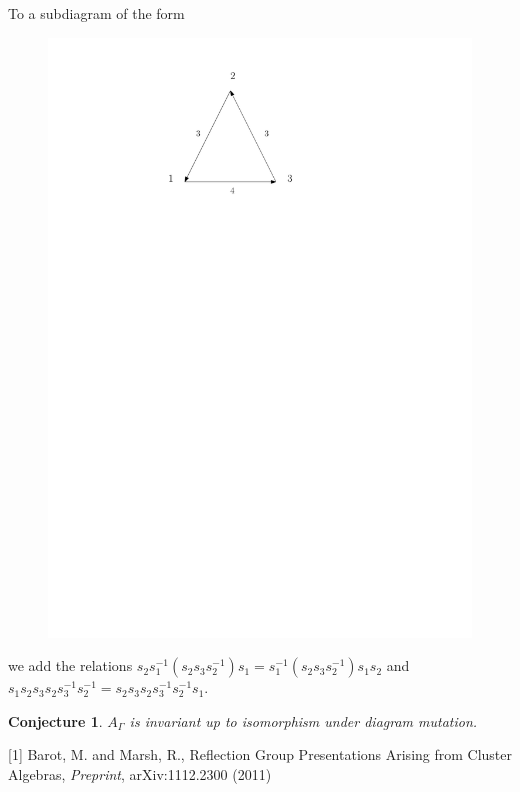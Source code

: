 \documentclass{beamer}
\newtheorem{Conjecture}{Conjecture}
\begin{document}
\begin{frame}
To a subdiagram of the form
\begin{figure}
\includegraphics[scale = .50]{Diagram5.pdf}
\end{figure}
we add the relations $s_{2}s_{1}^{-1}(s_{2}s_{3}s_{2}^{-1})s_{1} = s_{1}^{-1}(s_{2}s_{3}s_{2}^{-1})s_{1}s_{2}$ and $s_{1}s_{2}s_{3}s_{2}s_{3}^{-1}s_{2}^{-1} = s_{2}s_{3}s_{2}s_{3}^{-1}s_{2}^{-1}s_{1}$.
\end{frame}

\begin{frame}
\begin{Conjecture}
$A_{\Gamma}$ is invariant up to isomorphism under diagram mutation.
\end{Conjecture}
\end{frame}








\begin{frame}
\begin{thebibliography}{69}

[1] Barot, M. and Marsh, R., Reflection Group Presentations Arising from Cluster Algebras, \emph{Preprint}, arXiv:1112.2300 (2011)


\end{thebibliography}

\end{frame}
\end{document}
